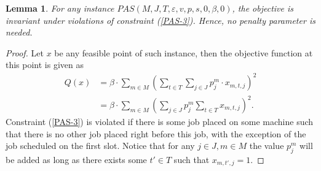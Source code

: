 \documentclass[12pt]{article}
\newtheorem{lemma}[theorem]{Lemma}
\begin{document}
\begin{lemma}\label{PAS-LMA-NB}
For any instance $PAS(M, J, T, \varepsilon, v, p, s, 0, \beta, 0)$, the objective is invariant under violations of constraint (\ref{PAS-3}). Hence, no penalty parameter is needed.
\end{lemma}
\begin{proof}
Let $x$ be any feasible point of such instance, then the objective function at this point is given as
\begin{align*}
Q(x) &= \beta \cdot \sum_{m \in M} \left( \sum_{t \in T} \sum_{j \in J} p^m_j \cdot x_{m,t,j} \right)^2 \\
&=  \beta \cdot \sum_{m \in M} \left(\sum_{j \in J} p^m_j  \sum_{t \in T}  x_{m,t,j} \right)^2.
\end{align*}
Constraint (\ref{PAS-3}) is violated if there is some job placed on some machine such that there is no other job placed right before this job, with the exception of the job scheduled on the first slot.
Notice that for any $j \in J, m \in M$ the value $p^m_j$ will be added as long as there exists some $t' \in T$ such that $x_{m, t', j} = 1$.
\end{proof}
\end{document}
